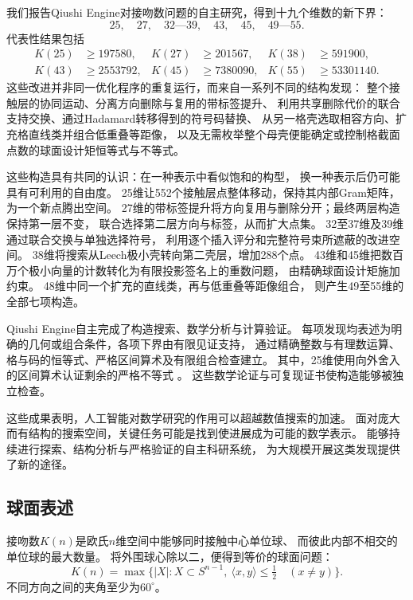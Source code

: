 我们报告Qiushi Engine对接吻数问题的自主研究，得到十九个维数的新下界：
\[
25,\quad27,\quad32\text{—}39,\quad43,\quad45,\quad49\text{—}55.
\]
代表性结果包括
\[
\begin{aligned}
K(25)&\ge197580,&K(27)&\ge201567,&K(38)&\ge591900,\\
K(43)&\ge2553792,&K(45)&\ge7380090,&K(55)&\ge53301140.
\end{aligned}
\]
这些改进并非同一优化程序的重复运行，而来自一系列不同的结构发现：
整个接触层的协同运动、分离方向删除与复用的带标签提升、
利用共享删除代价的联合支持交换、通过Hadamard转移得到的符号码替换、
从另一格壳选取相容方向、扩充格直线类并组合低重叠等距像，
以及无需枚举整个母壳便能确定或控制格截面点数的球面设计矩恒等式与不等式。

这些构造具有共同的认识：在一种表示中看似饱和的构型，
换一种表示后仍可能具有可利用的自由度。
25维让552个接触层点整体移动，保持其内部Gram矩阵，为一个新点腾出空间。
27维的带标签提升将方向复用与删除分开；最终两层构造保持第一层不变，
联合选择第二层方向与标签，从而扩大点集。
32至37维及39维通过联合交换与单独选择符号，
利用逐个插入评分和完整符号束所遮蔽的改进空间。
38维将搜索从Leech极小壳转向第二壳层，增加288个点。
43维和45维把数百万个极小向量的计数转化为有限投影签名上的重数问题，
由精确球面设计矩施加约束。
48维中同一个扩充的直线类，再与低重叠等距像组合，
则产生49至55维的全部七项构造。

Qiushi Engine自主完成了构造搜索、数学分析与计算验证。
每项发现均表述为明确的几何或组合条件，各项下界由有限见证支持，
通过精确整数与有理数运算、格与码的恒等式、严格区间算术及有限组合检查建立。
其中，25维使用向外舍入的区间算术认证剩余的严格不等式
\cite{johansson-arb}。
这些数学论证与可复现证书使构造能够被独立检查。

这些成果表明，人工智能对数学研究的作用可以超越数值搜索的加速。
面对庞大而有结构的搜索空间，关键任务可能是找到使进展成为可能的数学表示。
能够持续进行探索、结构分析与严格验证的自主科研系统，
为大规模开展这类发现提供了新的途径。

\subsection{球面表述}

接吻数$K(n)$是欧氏$n$维空间中能够同时接触中心单位球、
而彼此内部不相交的单位球的最大数量。
将外围球心除以二，便得到等价的球面问题：
\[
K(n)=\max\{|X|:X\subset S^{n-1},\
\langle x,y\rangle\le\tfrac12\quad(x\ne y)\}.
\]
不同方向之间的夹角至少为$60^\circ$。



